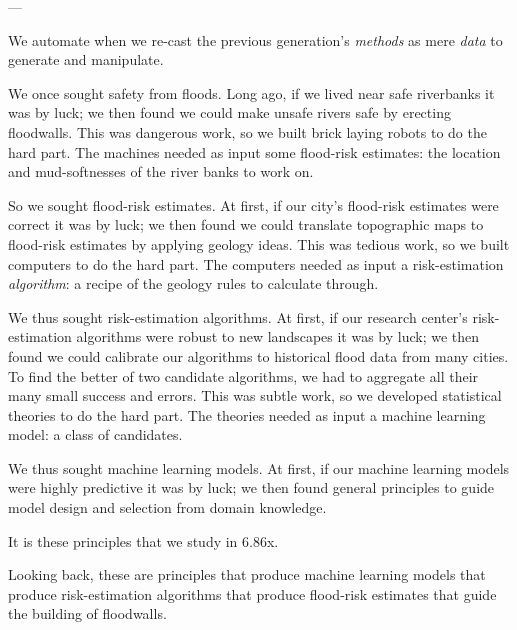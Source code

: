 \documentclass[11pt, justified]{tufte-book}
\newcommand{\samsubsubsection}[1]{
   \vspace{0.1cm}
   \par\noindent{\hspace{-2cm}\normalsize \sc \gre #1} ---
}
\theoremstyle{definition}
\begin{document}
    \samsubsubsection{a whimsical story about automation}
      We automate when we re-cast the previous generation's \emph{methods} as
      mere \emph{data} to generate and manipulate. 

      We once sought safety from floods.  Long ago, if we lived near safe
      riverbanks it was by luck; we then found we could make unsafe rivers safe
      by erecting floodwalls.  This was dangerous work, so we built brick
      laying robots to do the hard part.  The machines needed as input some
      flood-risk estimates: the location and mud-softnesses of the river banks to
      work on.

      So we sought flood-risk estimates.  At first, if our city's flood-risk
      estimates were correct it was by luck; we then found we could translate
      topographic maps to flood-risk estimates by applying geology ideas.  This
      was tedious work, so we built computers to do the hard part.  The
      computers needed as input a risk-estimation \emph{algorithm}: a recipe of
      the geology rules to calculate through.

      We thus sought risk-estimation algorithms.  At first, if our research
      center's risk-estimation algorithms were robust to new landscapes it was
      by luck; we then found we could calibrate our algorithms to historical
      flood data from many cities.  To find the better of two candidate
      algorithms, we had to aggregate all their many small success and errors.
      This was subtle work, so we developed statistical theories to do the hard
      part.  The theories needed as input a machine learning model: a class of
      candidates.

      We thus sought machine learning models.  At first, if our machine
      learning models were highly predictive it was by luck; we then found
      general principles to guide model design and selection from domain
      knowledge.

      It is these principles that we study in 6.86x.

      Looking back, these are principles that produce machine learning models
      that produce risk-estimation algorithms that produce flood-risk estimates
      that guide the building of floodwalls. 
\end{document}
